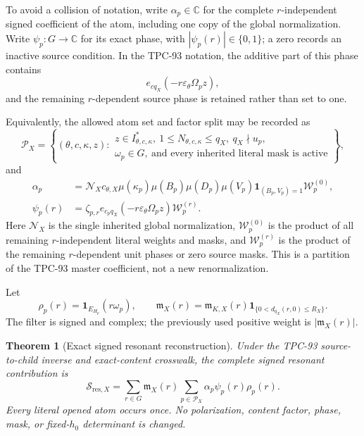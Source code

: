 \documentclass[11pt]{article}
\newtheorem{theorem}{Theorem}[section]
\theoremstyle{remark}
\newcommand{\C}{\mathbb C}
\newcommand{\one}{\mathbf 1}
\begin{document}
To avoid a collision of notation, write \(\alpha_p\in\C\) for the
complete \(r\)-independent signed coefficient of the atom, including
one copy of the global normalization.  Write
\(\psi_p:G\to\C\) for its exact phase, with
\(|\psi_p(r)|\in\{0,1\}\); a zero records an inactive source
condition.  In the TPC-93 notation, the additive part of this phase
contains
\[
 e_{cq_X}(-r\varepsilon_\theta\Omega_pz),
\]
and the remaining \(r\)-dependent source phase is retained rather
than set to one.

Equivalently, the allowed atom set and factor split may be recorded
as
\[
 \mathcal P_X=
 \left\{(\theta,c,\kappa,z):
 \begin{array}{l}
 z\in I_{\theta,c,\kappa}^{\ast},\
 1\le N_{\theta,c,\kappa}\le q_X,\
 q_X\nmid u_p,\\
 \omega_p\in G,\ \text{and every inherited literal mask is active}
 \end{array}\right\},
\]
and
\begin{align*}
 \alpha_p
 &=
 \mathcal N_Xc_{\theta,X}
 \mu(\kappa_p)\mu(B_p)\mu(D_p)\mu(V_p)
 \one_{(B_p,V_p)=1}\mathcal W_p^{(0)},\\
 \psi_p(r)
 &=
 \zeta_{p,r}
 e_{c_pq_X}(-r\varepsilon_\theta\Omega_pz)
 \mathcal W_p^{(r)}.
\end{align*}
Here \(\mathcal N_X\) is the single inherited global normalization,
\(\mathcal W_p^{(0)}\) is the product of all remaining
\(r\)-independent literal weights and masks, and
\(\mathcal W_p^{(r)}\) is the product of the remaining
\(r\)-dependent unit phases or zero source masks.  This is a
partition of the TPC-93 master coefficient, not a new
renormalization.

Let
\[
 \rho_p(r)
 =
 \one_{E_{H_p}}(r\omega_p),
\qquad
 \mathfrak m_X(r)=\mathfrak m_{K,X}(r)
 \one_{\{0<d_{q_X}(r,0)\le R_X\}}.
\]
The filter is signed and complex; the previously used positive
weight is \(|\mathfrak m_X(r)|\).

\begin{theorem}[Exact signed resonant reconstruction]
\label{thm:literal-reconstruction}
Under the TPC-93 source-to-child inverse and exact-content
crosswalk, the complete signed resonant contribution is
\begin{equation}
 \boxed{
 \mathcal S_{\mathrm{res},X}
 =
 \sum_{r\in G}\mathfrak m_X(r)
 \sum_{p\in\mathcal P_X}
 \alpha_p\psi_p(r)\rho_p(r).}
\label{eq:signed-frequency-form}
\end{equation}
Every literal opened atom occurs once.  No polarization, content
factor, phase, mask, or fixed-\(h_0\) determinant is changed.
\end{theorem}
\end{document}
